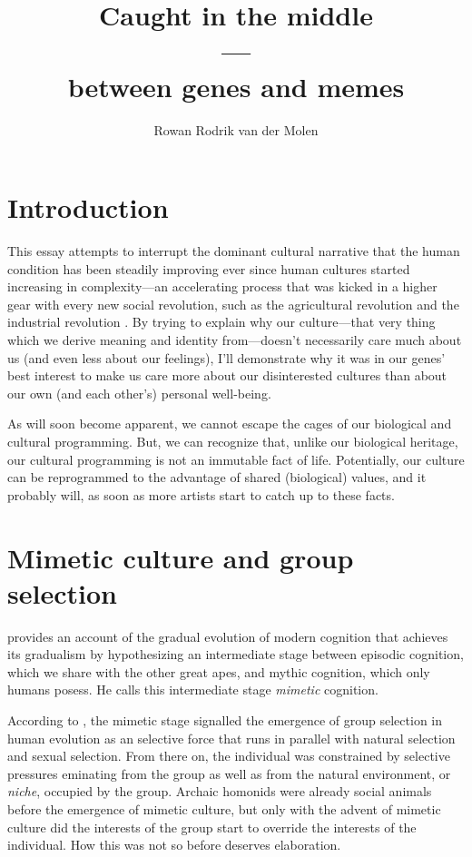 \documentclass{article}
\title{Caught in the middle\\---\\between genes and memes}
\author{Rowan Rodrik van der Molen}
\begin{document}
\maketitle

\tableofcontents

\section{Introduction}
\label{sec:intro}

This essay attempts to interrupt the dominant cultural narrative that the human
condition has been steadily improving ever since human cultures started
increasing in complexity---an accelerating process that was kicked in a higher
gear with every new social revolution, such as the agricultural revolution and
the industrial revolution \citep{botton2013}. By trying to explain why our
culture---that very thing which we derive meaning and identity from---doesn't
necessarily care much about us (and even less about our feelings), I'll
demonstrate why it was in our genes' best interest to make us care more about
our disinterested cultures than about our own (and each other's) personal
well-being.

As will soon become apparent, we cannot escape the cages of our biological and
cultural programming. But, we can recognize that, unlike our biological
heritage, our cultural programming is not an immutable fact of life.
Potentially, our culture can be reprogrammed to the advantage of shared
(biological) values, and it probably will, as soon as more artists start to
catch up to these facts.

\section{Mimetic culture and group selection}
\label{sec:mimesis}

\citet{donald1991} provides an account of the gradual evolution of modern
cognition that achieves its gradualism by hypothesizing an intermediate stage
between episodic cognition, which we share with the other great apes, and
mythic cognition, which only humans posess. He calls this intermediate stage
\textit{mimetic} cognition.

According to \citet{donald1991}, the mimetic stage signalled the emergence of
group selection in human evolution as an selective force that runs in parallel
with natural selection and sexual selection. From there on, the individual was
constrained by selective pressures eminating from the group as well as from
the natural environment, or \emph{niche}, occupied by the group. Archaic
homonids were already social animals before the emergence of mimetic culture,
but only with the advent of mimetic culture did the interests of the group
start to override the interests of the individual. How this was not so before
deserves elaboration.
\end{document}
